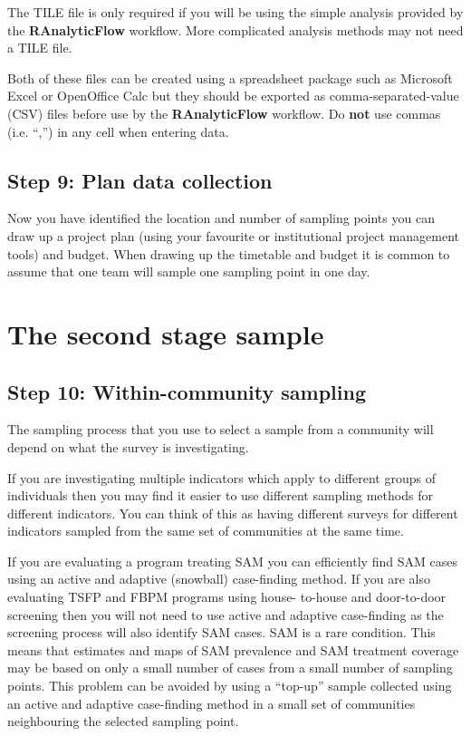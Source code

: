 \documentclass[12pt,a4paper]{book}
\theoremstyle{definition}
\theoremstyle{definition}
\theoremstyle{definition}
\theoremstyle{remark}
\begin{document}
The TILE file is only required if you will be using the simple analysis
provided by the \textbf{RAnalyticFlow} workflow. More complicated
analysis methods may not need a TILE file.

Both of these files can be created using a spreadsheet package such as
Microsoft Excel or OpenOffice Calc but they should be exported as
comma-separated-value (CSV) files before use by the
\textbf{RAnalyticFlow} workflow. Do \textbf{not} use commas (i.e. ``,'')
in any cell when entering data.

\newpage

\hypertarget{step-9-plan-data-collection}{%
\section{Step 9: Plan data
collection}\label{step-9-plan-data-collection}}

Now you have identified the location and number of sampling points you
can draw up a project plan (using your favourite or institutional
project management tools) and budget. When drawing up the timetable and
budget it is common to assume that one team will sample one sampling
point in one day.

\hypertarget{stage2}{%
\chapter{The second stage sample}\label{stage2}}

\hypertarget{step-10-within-community-sampling}{%
\section{Step 10: Within-community
sampling}\label{step-10-within-community-sampling}}

The sampling process that you use to select a sample from a community
will depend on what the survey is investigating.

If you are investigating multiple indicators which apply to different
groups of individuals then you may find it easier to use different
sampling methods for different indicators. You can think of this as
having different surveys for different indicators sampled from the same
set of communities at the same time.

If you are evaluating a program treating SAM you can efficiently find
SAM cases using an active and adaptive (snowball) case-finding method.
If you are also evaluating TSFP and FBPM programs using house- to-house
and door-to-door screening then you will not need to use active and
adaptive case-finding as the screening process will also identify SAM
cases. SAM is a rare condition. This means that estimates and maps of
SAM prevalence and SAM treatment coverage may be based on only a small
number of cases from a small number of sampling points. This problem can
be avoided by using a ``top-up'' sample collected using an active and
adaptive case-finding method in a small set of communities neighbouring
the selected sampling point.
\end{document}
